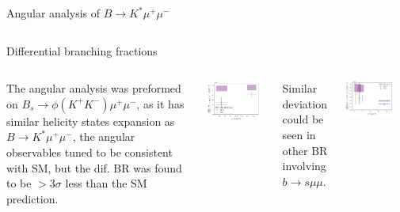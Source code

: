 \documentclass[9pt,usenames,dvipsnames]{beamer}
\begin{document}
\begin{frame}{Angular analysis of $ B \to K^* \mu^+ \mu^-$ }
\begin{columns}[c]
\begin{center}
		\end{center}
	\end{columns}
\end{frame}
\begin{frame}{Differential branching fractions}	
	\begin{columns}[c]
	The angular analysis was preformed on $ B_s \to \phi(K^+K^-) \mu^+\mu^-$, as it has similar helicity states expansion as  $ B \to K^* \mu^+ \mu^-$, the angular observables tuned to be consistent with SM, but the dif. BR was found to be $ > 3 \sigma$ less than the SM prediction.\\
	\begin{center}
		\includegraphics[width= 0.9\textwidth]{./assets/btophimumu} \\ {\tiny {}}
	\end{center}
		Similar deviation could be seen in other BR involving $b \to s \mu \mu $.\\
		\begin{center}
			\includegraphics[width=0.8\textwidth]{./assets/btokmumu} \\

\end{center}
\end{columns}
\end{frame}
\end{document}
